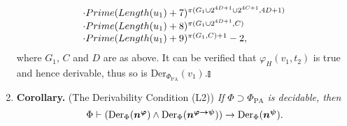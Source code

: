 \documentclass[leqno]{report}
\newcommand{\pa}{\mathrm{PA}}
\newcommand{\Der}[1]{\mathrm{Der}_{#1}}
\newcommand{\mbf}[1]{{\mbox{\boldmath\begin{math}#1\end{math}}}}
\begin{document}
\begin{enumerate}[1.]
\[\begin{array}{l}
\cdot Prime(Length(u_1) + 7)^{\pi (G_1 \cup 2^{4D + 1} \cup 2^{4C + 1}, 4D + 1)}\cr
\cdot Prime(Length(u_1) + 8)^{\pi (G_1 \cup 2^{4D + 1}, C)}\cr
\cdot Prime(Length(u_1) + 9)^{\pi (G_1, C) + 1} - 2,
\end{array}
\]
where $G_1$, $C$ and $D$ are as above. It can be verified that $\varphi_H (v_1, t_2)$ is true and hence derivable, thus so is $\Der{\Phi_\pa}(v_1)$.\nolinebreak\hfill$\talloblong$
%
\item \textbf{Corollary.} (The Derivability Condition (L2)) \emph{If $\Phi \supset \Phi_\pa$ is decidable, then
\[
\Phi \vdash (\Der{\Phi}(\mbf{n^\varphi}) \land \Der{\Phi}(\mbf{n^{\varphi \rightarrow \psi}})) \rightarrow \Der{\Phi}(\mbf{n^\psi}).
\]}
%

\end{enumerate}
\end{document}
